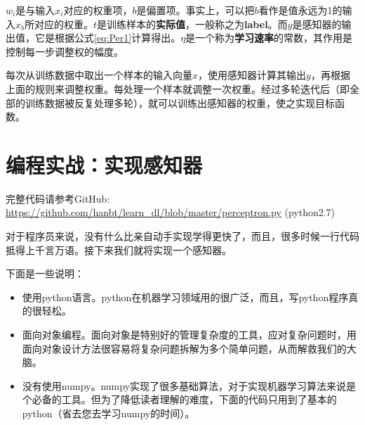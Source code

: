 $w_i$是与输入$x_i$对应的权重项，$b$是偏置项。事实上，可以把$b$看作是值永远为1的输入$x_b$所对应的权重。$t$是训练样本的\textbf{实际值}，一般称之为\textbf{label}。而$y$是感知器的输出值，它是根据公式\ref{eq:Per1}计算得出。$\eta$是一个称为\textbf{学习速率}的常数，其作用是控制每一步调整权的幅度。

每次从训练数据中取出一个样本的输入向量$x$，使用感知器计算其输出$y$，再根据上面的规则来调整权重。每处理一个样本就调整一次权重。经过多轮迭代后（即全部的训练数据被反复处理多轮），就可以训练出感知器的权重，使之实现目标函数。


\section{编程实战：实现感知器}\label{Per:5}

\begin{note}
	完整代码请参考GitHub: \url{https://github.com/hanbt/learn_dl/blob/master/perceptron.py}
	(python2.7)
\end{note}


对于程序员来说，没有什么比亲自动手实现学得更快了，而且，很多时候一行代码抵得上千言万语。接下来我们就将实现一个感知器。

下面是一些说明：
\begin{itemize}
	\item
	      使用python语言。python在机器学习领域用的很广泛，而且，写python程序真的很轻松。
	\item
	      面向对象编程。面向对象是特别好的管理复杂度的工具，应对复杂问题时，用面向对象设计方法很容易将复杂问题拆解为多个简单问题，从而解救我们的大脑。
	\item
	      没有使用numpy。numpy实现了很多基础算法，对于实现机器学习算法来说是个必备的工具。但为了降低读者理解的难度，下面的代码只用到了基本的python（省去您去学习numpy的时间）。
\end{itemize}



